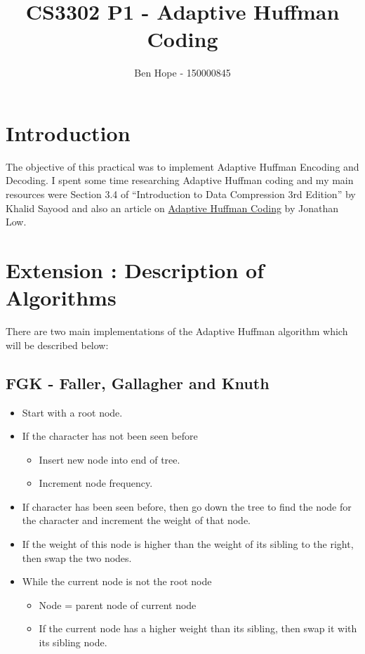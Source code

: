 \documentclass[12pt, letterpaper]{article}
\title{CS3302 P1 - Adaptive Huffman Coding}
\author{Ben Hope - 150000845}
\date{}
\begin{document}
\maketitle
\section{Introduction}
The objective of this practical was to implement Adaptive Huffman Encoding and Decoding. I spent some time researching Adaptive Huffman coding and my main resources were Section 3.4 of “Introduction to Data Compression 3rd Edition” by Khalid Sayood and also an article on \href{http://www.cs.duke.edu/csed/curious/compression/adaptivehuff.html}{Adaptive Huffman Coding} by Jonathan Low.
\section{Extension : Description of Algorithms}
There are two main implementations of the Adaptive Huffman algorithm which will be described below:
\subsection{FGK - Faller, Gallagher and Knuth}
\begin{itemize}
\item Start with a root node.
\item If the character has not been seen before
\begin{itemize}
\item Insert new node into end of tree.
\item Increment node frequency.
\end{itemize}
\item If character has been seen before, then go down the tree to find the node for the character and increment the weight of that node.
\item If the weight of this node is higher than the weight of its sibling to the right, then swap the two nodes.
\item While the current node is not the root node
\begin{itemize}
\item Node =  parent node of current node
\item If the current node has a higher weight than its sibling, then swap it with its sibling node.
\end{itemize}
\end{itemize}
\end{document}
